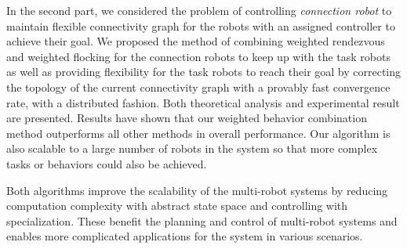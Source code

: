 \documentclass[../main.tex]{subfiles}
\begin{document}
In the second part, we considered the problem of controlling \textit{connection robot} to maintain flexible connectivity graph for the robots with an assigned controller to achieve their goal. We proposed the method of combining weighted rendezvous and weighted flocking for the connection robots to keep up with the task robots as well as providing flexibility for the task robots to reach their goal by correcting the topology of the current connectivity graph with a provably fast convergence rate, with a distributed fashion. Both theoretical analysis and experimental result are presented. Results have shown that our weighted behavior combination method outperforms all other methods in overall performance. Our algorithm is also scalable to a large number of robots in the system so that more complex tasks or behaviors could also be achieved.

Both algorithms improve the scalability of the multi-robot systems by reducing computation complexity with abstract state space and controlling with specialization. These benefit the planning and control of multi-robot systems and enables more complicated applications for the system in various scenarios.
\end{document}
